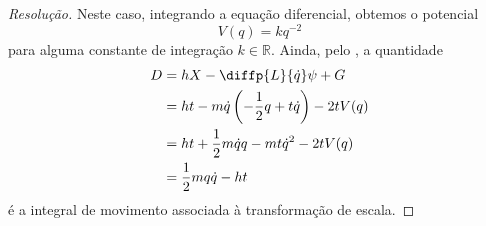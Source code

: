 \begin{proof}[Resolução]
    Neste caso, integrando a equação diferencial, obtemos o potencial
    \begin{equation*}
        V(q) = kq^{-2}
    \end{equation*}
    para alguma constante de integração \(k \in \mathbb{R}\). Ainda, pelo , a quantidade
    \begin{align*}
        D &= hX - \diffp{L}{\dot{q}}\psi + G\\
          &= ht - m\dot{q}\left(-\frac{1}{2}q + t\dot{q}\right) - 2t V(q)\\
          &= ht + \frac12m\dot{q}q - mt \dot{q}^2 - 2t V(q)\\
          &= \frac12 mq\dot{q}-ht
    \end{align*}
    é a integral de movimento associada à transformação de escala.
\end{proof}
